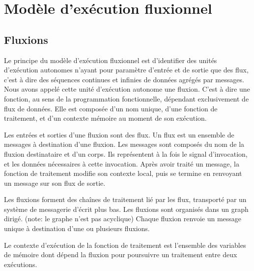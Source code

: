\section{Modèle d'exécution fluxionnel}

\subsection{Fluxions}

Le principe du modèle d'exécution fluxionnel est d'identifier des unités d'exécution autonomes n'ayant pour paramètre d'entrée et de sortie que des flux, c'est à dire des séquences continues et infinies de données agrégés par messages.
Nous avons appelé cette unité d'exécution autonome une fluxion.
C'est à dire une fonction, au sens de la programmation fonctionnelle, dépendant exclusivement de flux de données.
Elle est composée d'un nom unique, d'une fonction de traitement, et d'un contexte mémoire au moment de son exécution.

Les entrées et sorties d'une fluxion sont des flux.
Un flux est un ensemble de messages à destination d'une fluxion.
Les messages sont composés du nom de la fluxion destinataire et d'un corps.
Ils représentent à la fois le signal d'invocation, et les données nécessaires à cette invocation.
Après avoir traité un message, la fonction de traitement modifie son contexte local, puis se termine en renvoyant un message sur son flux de sortie.

Les fluxions forment des chaînes de traitement lié par les flux, transporté par un système de messagerie d'écrit plus bas.
Les fluxions sont organisés dans un graph dirigé. (note: le graphe n'est pas acyclique)
Chaque fluxion renvoie un message unique à destination d'une ou plusieurs fluxions.

Le contexte d'exécution de la fonction de traitement est l'ensemble des variables de mémoire dont dépend la fluxion pour poursuivre un traitement entre deux exécutions.

